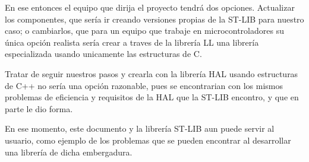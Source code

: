 \documentclass{report}
\begin{document}
\par
En ese entonces el equipo que dirija el proyecto tendrá dos opciones. Actualizar los componentes, que sería ir creando versiones propias de la ST-LIB para nuestro caso; o cambiarlos, que para un equipo que trabaje en microcontroladores su única opción realista sería crear a traves de la librería LL una librería especializada usando unicamente las estructuras de C. 
\par
Tratar de seguir nuestros pasos y crearla con la librería HAL usando estructuras de C++ no sería una opción razonable, pues se encontrarian con los mismos problemas de eficiencia y requisitos de la HAL que la ST-LIB encontro, y que en parte le dio forma. 
\par
En ese momento, este documento y la librería ST-LIB aun puede servir al usuario, como ejemplo de los problemas que se pueden encontrar al desarrollar una librería de dicha embergadura. 




\end{document}
